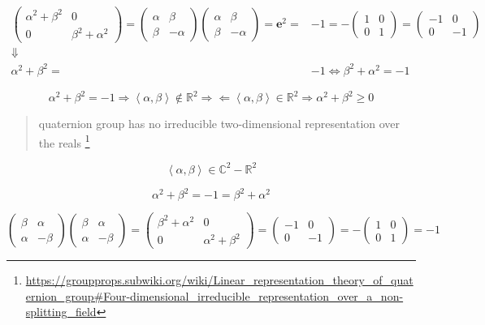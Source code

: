 \documentclass[
]{book}
\theoremstyle{definition}
\theoremstyle{definition}
\theoremstyle{definition}
\theoremstyle{definition}
\theoremstyle{remark}
\begin{document}
\[
\begin{aligned}
\begin{pmatrix}\alpha^{2}+\beta^{2} & 0\\
0 & \beta^{2}+\alpha^{2}
\end{pmatrix}=\begin{pmatrix}\alpha & \beta\\
\beta & -\alpha
\end{pmatrix}\begin{pmatrix}\alpha & \beta\\
\beta & -\alpha
\end{pmatrix}=\boldsymbol{e}^{2}= & -1=-\begin{pmatrix}1 & 0\\
0 & 1
\end{pmatrix}=\begin{pmatrix}-1 & 0\\
0 & -1
\end{pmatrix}\\
\Downarrow\\
\alpha^{2}+\beta^{2}= & -1\Leftrightarrow\beta^{2}+\alpha^{2}=-1
\end{aligned}
\]

\[
\alpha^{2}+\beta^{2}=-1\Rightarrow\left\langle \alpha,\beta\right\rangle \notin\mathbb{R}^{2}\Rightarrow\Leftarrow\left\langle \alpha,\beta\right\rangle \in\mathbb{R}^{2}\Rightarrow\alpha^{2}+\beta^{2}\ge0
\]

\begin{quote}
quaternion group has no irreducible two-dimensional representation over the reals \footnote{\url{https://groupprops.subwiki.org/wiki/Linear_representation_theory_of_quaternion_group\#Four-dimensional_irreducible_representation_over_a_non-splitting_field}}
\end{quote}

\[
\left\langle \alpha,\beta\right\rangle \in\mathbb{C}^{2}-\mathbb{R}^{2}
\]

\[
\alpha^{2}+\beta^{2}=-1=\beta^{2}+\alpha^{2}
\]

\[
\begin{pmatrix}\beta & \alpha\\
\alpha & -\beta
\end{pmatrix}\begin{pmatrix}\beta & \alpha\\
\alpha & -\beta
\end{pmatrix}=\begin{pmatrix}\beta^{2}+\alpha^{2} & 0\\
0 & \alpha^{2}+\beta^{2}
\end{pmatrix}=\begin{pmatrix}-1 & 0\\
0 & -1
\end{pmatrix}=-\begin{pmatrix}1 & 0\\
0 & 1
\end{pmatrix}=-1
\]
\end{document}
